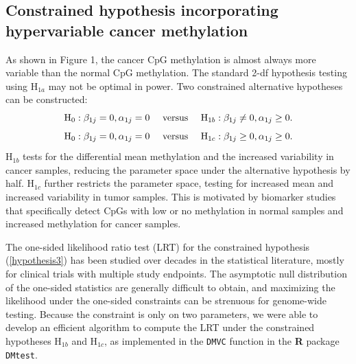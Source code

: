 \documentclass{statsoc}
\begin{document}
\subsection{Constrained hypothesis incorporating hypervariable cancer methylation}


As shown in Figure 1, the cancer CpG methylation is almost always more variable than the normal CpG methylation. The standard 2-df hypothesis testing using H$_{1a}$ may not be optimal in power. Two constrained alternative hypotheses can be constructed:
\begin{equation}
\mbox{H}_{0}: \beta_{1j}=0, \alpha_{1j}=0  \mbox{\hspace{10pt} versus \hspace{10pt}}\mbox{H}_{1b}: \beta_{1j} \neq 0 , \alpha_{1j} \geq 0. \label{hypothesis2}
\end{equation}
\begin{equation}
\mbox{H}_{0}: \beta_{1j}=0, \alpha_{1j}=0  \mbox{\hspace{10pt} versus \hspace{10pt}}\mbox{H}_{1c}: \beta_{1j} \geq 0 , \alpha_{1j} \geq 0. \label{hypothesis3}
\end{equation}
H$_{1b}$ tests for the differential mean methylation and the increased variability in cancer samples, reducing the parameter space under the alternative hypothesis by half. H$_{1c}$ further restricts the parameter space, testing for increased mean and increased variability in tumor samples. This is motivated by biomarker studies that specifically detect CpGs with low or no methylation in normal samples and increased methylation for cancer samples.

The one-sided likelihood ratio test (LRT) for the constrained hypothesis (\ref{hypothesis3}) has been studied over decades in the statistical literature, mostly for clinical trials with multiple study endpoints\citep{Kudo63,Perlman69}. The asymptotic null distribution of the one-sided statistics are generally difficult to obtain, and maximizing the likelihood under the one-sided constraints can be strenuous for genome-wide testing. Because the constraint is only on two parameters, we were able to develop an efficient algorithm to compute the LRT under the constrained hypotheses H$_{1b}$ and H$_{1c}$, as implemented in the \texttt{DMVC} function in the {\bf R} package \texttt{DMtest}.
\end{document}
